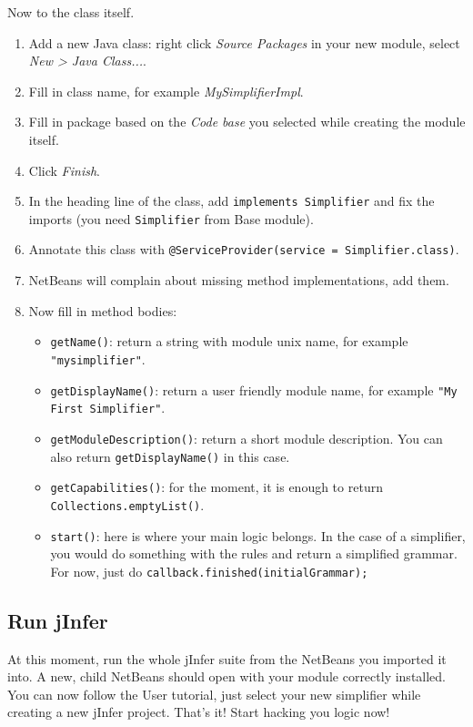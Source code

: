 \documentclass[a4paper,10pt,oneside]{article}
\begin{document}
\par 
Now to the class itself.
\begin{enumerate}
  \item Add a new Java class: right click \textit{Source Packages} in your new
      module, select \textit{New > Java Class...}.
  \item Fill in class name, for example \textit{MySimplifierImpl}.
  \item Fill in package based on the \textit{Code base} you selected while creating
      the module itself.
  \item Click \textit{Finish}.
  \item In the heading line of the class, add \texttt{implements Simplifier} and
      fix the imports (you need \texttt{Simplifier} from Base module).
  \item Annotate this class with \texttt{@ServiceProvider(service = Simplifier.class)}.
  \item NetBeans will complain about missing method implementations, add them.
  \item 
    Now fill in method bodies:
    \begin{itemize}
      \item \texttt{getName()}: return a string with module unix name, for example \texttt{"mysimplifier"}.
      \item \texttt{getDisplayName()}: return a user friendly module name, for example \texttt{"My First Simplifier"}.
      \item \texttt{getModuleDescription()}: return a short module description. You can also return \texttt{getDisplayName()} in this case.
      \item \texttt{getCapabilities()}: for the moment, it is enough to return \texttt{Collections.emptyList()}.
      \item \texttt{start()}: here is where your main logic belongs. In the case of a simplifier, you would do something with the rules and return a simplified grammar. For now, just do \texttt{callback.finished(initialGrammar);}
    \end{itemize}
  
\end{enumerate}

\subsection*{Run jInfer}
\par 
  At this moment, run the whole jInfer suite from the NetBeans you imported it into.
  A new, child NetBeans should open with your module correctly installed. You can
  now follow the User tutorial, just select your new
  simplifier while creating a new jInfer project.
  That's it! Start hacking you logic now!
\end{document}
